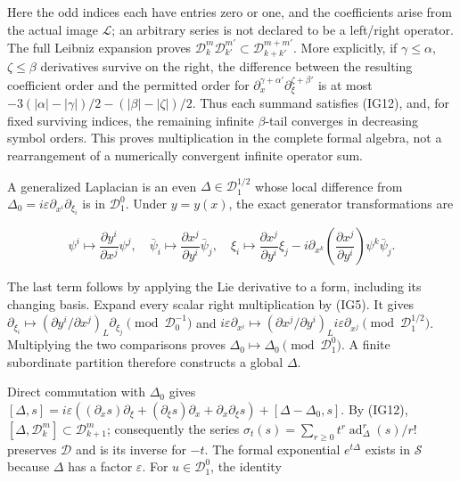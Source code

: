 \documentclass[
  11pt,
]{article}
\begin{document}
Here the odd indices each have entries zero or one, and the coefficients
arise from the actual image \(\mathcal L\); an arbitrary series is not
declared to be a left/right operator. The full Leibniz expansion proves
\(\mathcal D^m_k\mathcal D^{m'}_{k'}\subset\mathcal D^{m+m'}_{k+k'}\).
More explicitly, if \(\gamma\leq\alpha\), \(\zeta\leq\beta\) derivatives
survive on the right, the difference between the resulting coefficient
order and the permitted order for
\(\partial_x^{\gamma+\alpha'}\partial_\xi^{\zeta+\beta'}\) is at most
\(-3(|\alpha|-|\gamma|)/2-(|\beta|-|\zeta|)/2\). Thus each summand
satisfies (IG12), and, for fixed surviving indices, the remaining
infinite \(\beta\)-tail converges in decreasing symbol orders. This
proves multiplication in the complete formal algebra, not a
rearrangement of a numerically convergent infinite operator sum.

A generalized Laplacian is an even \(\Delta\in\mathcal D^{1/2}_1\) whose
local difference from
\(\Delta_0=i\varepsilon\partial_{x^i}\partial_{\xi_i}\) is in
\(\mathcal D^0_1\). Under \(y=y(x)\), the exact generator
transformations are

\[
 \psi^i\mapsto\frac{\partial y^i}{\partial x^j}\psi^j,
 \quad\bar\psi_i\mapsto\frac{\partial x^j}{\partial y^i}\bar\psi_j,
 \quad\xi_i\mapsto
 \frac{\partial x^j}{\partial y^i}\xi_j
 -i\partial_{x^k}\!\left(\frac{\partial x^j}{\partial y^i}\right)
                      \psi^k\bar\psi_j.
\tag{IG13}
\]

The last term follows by applying the Lie derivative to a form,
including its changing basis. Expand every scalar right multiplication
by (IG5). It gives
\(\partial_{\xi_i}\mapsto(\partial y^i/\partial x^j)_L\partial_{\xi_j}\pmod{\mathcal D^{-1}_0}\)
and
\(i\varepsilon\partial_{x^i}\mapsto(\partial x^j/\partial y^i)_L i\varepsilon\partial_{x^j}\pmod{\mathcal D^{1/2}_1}\).
Multiplying the two comparisons proves
\(\Delta_0\mapsto\Delta_0\pmod{\mathcal D^0_1}\). A finite subordinate
partition therefore constructs a global \(\Delta\).

Direct commutation with \(\Delta_0\) gives
\([\Delta,s]=i\varepsilon((\partial_xs)\partial_\xi+(\partial_\xi s)\partial_x+\partial_x\partial_\xi s)+[\Delta-\Delta_0,s]\).
By (IG12), \([\Delta,\mathcal D^m_k]\subset\mathcal D^m_{k+1}\);
consequently the series
\(\sigma_t(s)=\sum_{r\geq0}t^r\operatorname{ad}_\Delta^r(s)/r!\)
preserves \(\mathcal D\) and is its inverse for \(-t\). The formal
exponential \(e^{t\Delta}\) exists in \(\mathcal S\) because \(\Delta\)
has a factor \(\varepsilon\). For \(u\in\mathcal D^0_1\), the identity
\end{document}
